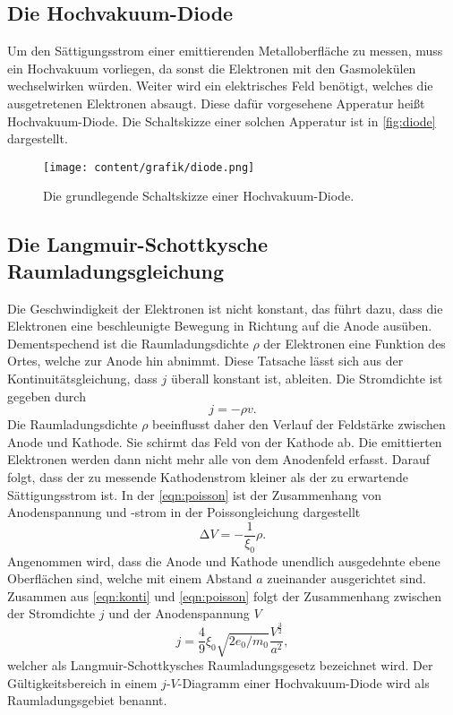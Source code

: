 \subsection{Die Hochvakuum-Diode}
\label{sec:Die Hochvakuum-Diode}

Um den Sättigungsstrom einer emittierenden Metalloberfläche zu messen, muss ein Hochvakuum vorliegen, da sonst die
Elektronen mit den Gasmolekülen wechselwirken würden. Weiter wird ein elektrisches Feld benötigt, welches die ausgetretenen Elektronen
absaugt. Diese dafür vorgesehene Apperatur heißt Hochvakuum-Diode. Die Schaltskizze einer solchen Apperatur ist in \autoref{fig:diode} 
dargestellt.

\begin{figure}[H]
    \centering
    \texttt{[image: content/grafik/diode.png]}
    \caption{Die grundlegende Schaltskizze einer Hochvakuum-Diode.\cite{elektron}}
    \label{fig:diode}
\end{figure}

\subsection{Die Langmuir-Schottkysche Raumladungsgleichung}
\label{sec:Die Langmuir-Schottkysche Raumladungsgleichung}

Die Geschwindigkeit der Elektronen ist nicht konstant, das führt dazu, dass die Elektronen
eine beschleunigte Bewegung in Richtung auf die Anode ausüben. Dementspechend ist die Raumladungsdichte $\rho$
der Elektronen eine Funktion des Ortes, welche zur Anode hin abnimmt.  Diese Tatsache lässt sich aus der
Kontinuitätsgleichung, dass $j$ überall konstant ist, ableiten.
Die Stromdichte ist gegeben durch
\begin{equation}
    j = - \rho v .
\label{eqn:konti}
\end{equation}
Die Raumladungsdichte $\rho$ beeinflusst daher den Verlauf der Feldstärke zwischen Anode und Kathode.
Sie schirmt das Feld von der Kathode ab. Die emittierten Elektronen werden dann nicht mehr alle von dem
Anodenfeld erfasst. Darauf folgt, dass der zu messende Kathodenstrom kleiner als der zu erwartende Sättigungsstrom ist.
In der \autoref{eqn:poisson} ist der Zusammenhang von Anodenspannung und -strom in der Poissongleichung dargestellt
\begin{equation}
    \increment V = - \frac{1}{\xi_0}\rho .
    \label{eqn:poisson}
\end{equation} 
Angenommen wird, dass die Anode und Kathode unendlich ausgedehnte ebene Oberflächen sind, welche
mit einem Abstand $a$ zueinander ausgerichtet sind.
Zusammen aus \autoref{eqn:konti} und \autoref{eqn:poisson} folgt der Zusammenhang
zwischen der Stromdichte $j$ und der Anodenspannung $V$
\begin{equation}
    j = \frac{4}{9} \xi_0 \sqrt{2 e_0/m_0} \frac{V^{\frac{3}{2}}}{a^2} ,
\label{eqn:langmuir}
\end{equation}
welcher als Langmuir-Schottkysches Raumladungsgesetz bezeichnet wird. Der Gültigkeitsbereich 
in einem $j$-$V$-Diagramm einer Hochvakuum-Diode wird als Raumladungsgebiet benannt.

